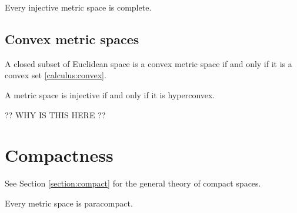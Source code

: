     \begin{property}
        Every injective metric space is complete.
    \end{property}

\subsection{Convex metric spaces}

    \begin{property}
        A closed subset of Euclidean space is a convex metric space if and only if it is a convex set \ref{calculus:convex}.
    \end{property}


    \begin{theorem}
        A metric space is injective if and only if it is hyperconvex.
    \end{theorem}

    ?? WHY IS THIS HERE ??

\section{Compactness}

    See Section \ref{section:compact} for the general theory of compact spaces.

    \begin{theorem}[Stone]
        Every metric space is paracompact.
    \end{theorem}

